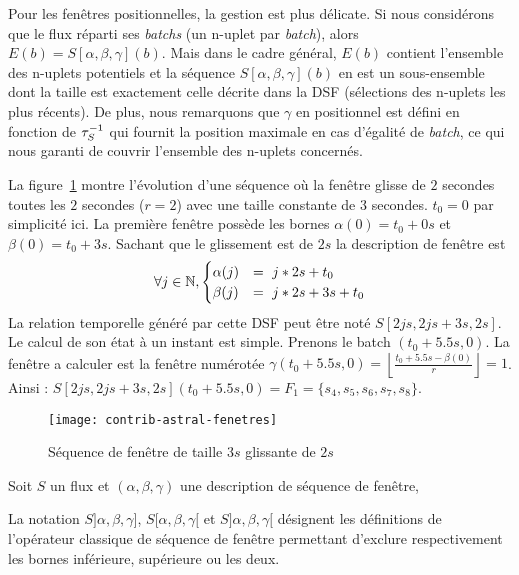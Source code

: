 Pour les fenêtres positionnelles, la gestion est plus délicate. Si nous considérons que le flux réparti ses \textit{batchs} (un n-uplet par \textit{batch}), alors $E(b) = S[\alpha,\beta,\gamma](b)$. Mais dans le cadre général, $E(b)$ contient l'ensemble des n-uplets potentiels et la séquence $S[\alpha,\beta,\gamma](b)$ en est un sous-ensemble dont la taille est exactement celle décrite dans la DSF (sélections des n-uplets les plus récents). De plus, nous remarquons que $\gamma$ en positionnel est défini en fonction de $\tau^{-1}_S$ qui fournit la position maximale en cas d'égalité de \textit{batch}, ce qui nous garanti de couvrir l'ensemble des n-uplets concernés.

	
\begin{example}
	La figure~\ref{fig:contrib:astral:fenetres} montre l'évolution d'une séquence où la fenêtre glisse de $2$ secondes toutes les $2$ secondes ($r=2$) avec une taille constante de $3$ secondes. $t_0 = 0$ par simplicité ici. 
La première fenêtre possède les bornes $\alpha(0) = t_0+ 0s$ et $\beta(0) =t_0+3s$. Sachant que le glissement est de $2s$ la description de fenêtre est $$\forall j \in \N, \begin{cases} \alpha(j)  & =\ j*2s+t_0 \\ \beta(j) & = \ j*2s+3s+t_0\end{cases}$$
La relation temporelle généré par cette DSF peut être noté $S[2js,2js+3s,2s]$.  Le calcul de son état à un instant est simple. Prenons le batch $(t_0+5.5s,0)$. La fenêtre a calculer est la fenêtre numérotée $\gamma(t_0+5.5s,0) = \left\lfloor \frac{t_0+5.5s-\beta(0)}{r}\right\rfloor = 1$. Ainsi : $S[2js,2js+3s,2s](t_0+5.5s,0) = F_1 = \{s_4,s_5,s_6,s_7,s_8\}$.
\end{example}
\begin{figure}[ht]
	\centering
	\texttt{[image: contrib-astral-fenetres]}
	\caption{Séquence de fenêtre de taille $3s$ glissante de $2s$}\label{fig:contrib:astral:fenetres}
\end{figure}

\begin{defi}\label{def:exclufenetre}
    Soit $S$ un flux et $(\alpha,\beta,\gamma)$ une description de séquence de fenêtre,

    La notation $S]\alpha,\beta,\gamma]$, $S[\alpha,\beta,\gamma[$ et $S]\alpha,\beta,\gamma[$ désignent les définitions de l'opérateur classique de séquence de fenêtre permettant d'exclure respectivement les bornes inférieure, supérieure ou les deux.
\end{defi}

